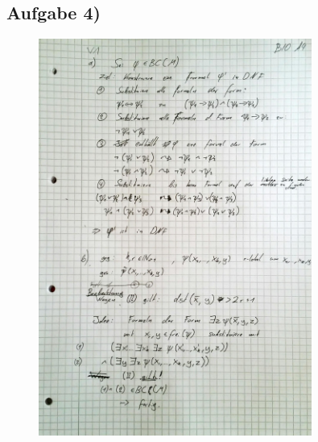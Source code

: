 \documentclass[12pt]{article}
\begin{document}
\subsection*{Aufgabe 4)}

\begin{figure}[h]
 \centering
 \includegraphics[width=0.8\textwidth]{A4.jpg}
 \caption{}
\end{figure}
\end{document}
